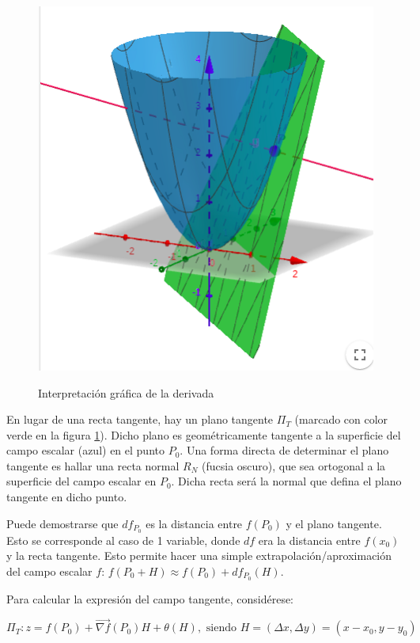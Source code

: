 \documentclass{article}
\begin{document}
\begin{figure}[ht]
\caption{Interpretación gráfica de la derivada}
\centering
\includegraphics[scale=0.6]{img/derivadas/interpretacion_grafica.png} 
\label{fig:deriv_graf}
\end{figure}

En lugar de una recta tangente, hay un plano tangente $\Pi_T$ (marcado con color verde en la figura \ref{fig:deriv_graf}). Dicho plano es geométricamente tangente a la superficie del campo escalar (azul) en el punto $P_0$. Una forma directa de determinar el plano tangente es hallar una recta normal $R_N$ (fucsia oscuro), que sea ortogonal a la superficie del campo escalar en $P_0$. Dicha recta será la normal que defina el plano tangente en dicho punto.

Puede demostrarse que $df_{P_0}$ es la distancia entre $f(P_0)$ y el plano tangente. Esto se corresponde al caso de 1 variable, donde $df$ era la distancia entre $f(x_0)$ y la recta tangente. Esto permite hacer una simple extrapolación/aproximación del campo escalar $f$: $f(P_0 + H) \approx f(P_0) + df_{P_0}(H)$. 

Para calcular la expresión del campo tangente, considérese:

\begin{equation}
\Pi_T: z = f(P_0) + \overrightarrow{\nabla{f}}(P_0) H + \theta(H), \text{ siendo } H = (\Delta x, \Delta y) = (x-x_0, y-y_0)
\end{equation}
\end{document}
